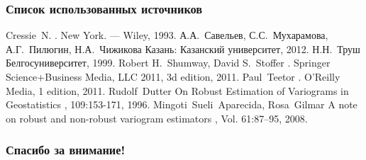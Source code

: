 \documentclass[notheorems]{beamer}
\theoremstyle{definition}
\theoremstyle{example}
\theoremstyle{plain}
\begin{document}
\begin{frame}
  \frametitle{Список использованных источников}
  \begin{scriptsize}
  \begin{thebibliography}{5}
    \beamertemplatebookbibitems
      Cressie~N.
      .
      \newblock New York. --- Wiley, 1993.
    \beamertemplatebookbibitems
      А.А.~Савельев, С.С.~Мухарамова, А.Г.~Пилюгин, Н.А.~Чижикова
      \newblock Казань: Казанский университет, 2012.
    \beamertemplatebookbibitems
      Н.Н.~Труш
      \newblock Белгосуниверситет, 1999.
    \beamertemplatebookbibitems
      Robert H.~Shumway, David S.~Stoffer
      .
      \newblock Springer Science+Business Media, LLC 2011, 3d edition, 2011.
    \beamertemplatebookbibitems
      Paul~Teetor
      .
      \newblock O’Reilly Media, 1 edition, 2011.
    \beamertemplatearticlebibitems
      Rudolf~Dutter
      \newblock On Robust Estimation of Variograms in Geostatistics
      , 109:153-171, 1996.
    \beamertemplatearticlebibitems
      Mingoti~Sueli~Aparecida, Rosa~Gilmar
      \newblock A note on robust and non-robust variogram estimators
      , Vol. 61:87–95, 2008.
    \beamertemplatebookbibitems
  \end{thebibliography}
\end{scriptsize}
\end{frame}

\begin{frame}[c]
\begin{center}
\frametitle{\LARGE Спасибо за внимание!}

{\LARGE \inserttitle}

\bigskip

{\insertauthor}

\bigskip\bigskip

{\insertinstitute}

\bigskip\bigskip

{\large \insertdate}
\end{center}
\end{frame}
\end{document}
